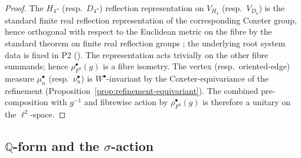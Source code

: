 \documentclass[11pt, a4paper]{amsart}
\theoremstyle{definition}
\newcommand{\Q}{\mathbb{Q}}
\begin{document}
\begin{proof}
The $H_4$- (resp.\ $D_4$-) reflection representation on $V_{H_4}$
(resp.\ $V_{D_4}$) is the standard finite real reflection
representation of the corresponding Coxeter group, hence orthogonal
with respect to the Euclidean metric on the fibre by the standard
theorem on finite real reflection groups
\cite[Ch.~1]{Humphreys}; the underlying root
system data is fixed in P2 (\cite[Definition~\texttt{def:V600},
Definition~\texttt{def:V24} and
Proposition~\texttt{prop:24-in-600}]{AlgebraicSubstrate}). The
representation acts trivially on the other fibre summands; hence
$\rho_{F^0}^\bullet(g)$ is a fibre isometry.
The vertex (resp.\ oriented-edge) measure $\mu_n^\bullet$ (resp.\
$\nu_n^\bullet$) is $W^\bullet$-invariant by the
Coxeter-equivariance of the refinement
(Proposition~\ref{prop:refinement-equivariant}).
The combined pre-composition with
$g^{-1}$ and fibrewise action by $\rho_{F^0}^\bullet(g)$ is
therefore a unitary on the $\ell^2$-space.
\end{proof}

\subsection{$\Q$-form and the $\sigma$-action}
\end{document}
